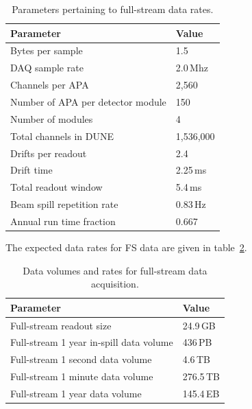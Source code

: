 \begin{table}[ht!]
	\centering
	\begin{tabular}{| p{3in} | p{1.1in} |}
		\hline

	\textbf{Parameter} & \textbf{Value} \\ \hline
	
	Bytes per sample & 1.5 \\ \hline
	
	DAQ sample rate & 2.0\,Mhz \\ \hline
	
	Channels per APA & 2,560 \\ \hline
	
	Number of APA per detector module & 150 \\ \hline
	
	Number of modules & 4 \\ \hline
	
	Total channels in DUNE & 1,536,000 \\ \hline \hline
	
	Drifts per readout & 2.4 \\ \hline
	
	Drift time & 2.25\,ms \\ \hline

	Total readout window & 5.4\,ms \\ \hline \hline
	
	Beam spill repetition rate & 0.83\,Hz \\ \hline
	
	Annual run time fraction & 0.667 \\ \hline
	\end{tabular}
	\caption{Parameters pertaining to full-stream data rates.}
	\label{tab:full-stream-parameters}
\end{table}
The expected data rates for FS data are given
in table~\ref{tab:full-stream-volume}.
\begin{table}[ht!]
	\centering
	\begin{tabular}{| p{3in} | p{1.1in} |}
		\hline	
	
	\textbf{Parameter} & \textbf{Value} \\ \hline
	Full-stream readout size & 24.9\,GB \\ \hline
	Full-stream 1 year in-spill data volume & 436\,PB \\ \hline
	Full-stream 1 second data volume & 4.6\,TB \\
	Full-stream 1 minute data volume & 276.5\,TB \\	\hline
	Full-stream 1 year data volume & 145.4\,EB \\ \hline
	\end{tabular}
	\caption{Data volumes and rates for full-stream data acquisition.}
	\label{tab:full-stream-volume}
\end{table}
